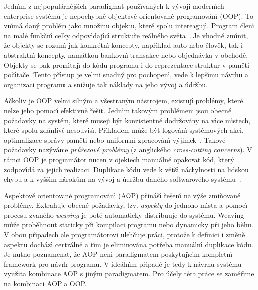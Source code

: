Jedn\'{\i}m z nejpopulárnějš\'{\i}ch paradigmat použ\'{\i}van\'ych k
v\'yvoji modern\'{\i}ch enterprise systémů je nepochybně
objektově orientované programován\'{\i} (\gls{OOP}). To vn\'{\i}má dan\'y problém
jako množinu objektu, které spolu intereaguj\'{\i}. Program
člen\'{\i} na malé funkčn\'{\i} celky odpov\'{\i}daj\'{\i}c\'{\i} struktuře
reálného světa~\cite{rentsch1982object}. Je vhodné zm\'{\i}nit,
že objekty se rozum\'{\i} jak konkrétn\'{\i} koncepty, např\'{\i}klad
auto nebo člověk, tak i abstraktn\'{\i} koncepty,
namátkou bankovn\'{\i} transakce nebo objednávka v obchodě.
Objekty se pak prom\'{\i}taj\'{\i} do kódu programu i do
reprezentace struktur v paměti poč\'{\i}tače.
Tento př\'{\i}stup je velmi snadn\'y pro pochopen\'{\i},
vede k lepš\'{\i}mu návrhu a organizaci programu a snižuje
tak náklady na jeho v\'yvoj a údržbu.

Ačkoliv je \gls{OOP} velmi siln\'ym a všestran\'ym nástrojem,
existuj\'{\i} problémy, které nelze jeho pomoc\'{\i} efektivně řešit.
Jedn\'{\i}m takov\'ym problémem jsou obecné požadavky na systém,
které musej\'{\i} b\'yt konzistentně dodržovány na v\'{\i}ce m\'{\i}stech,
které spolu zdánlivě nesouvis\'{\i}. Př\'{\i}kladem
může b\'yt logován\'{\i} systémov\'ych akc\'{\i}, optimalizace správy paměti
nebo uniformn\'{\i} zpracován\'{\i} v\'yjimek~\cite{kiczales1997aspect}.
Takové požadavky naz\'yváme \textit{průřezové problémy}
(z anglického \textit{cross-cutting concerns}).
V rámci \gls{OOP} je programátor nucen v ojektech manuálně opakovat
kód, kter\'y zodpov\'{\i}dá za jejich realizaci. Duplikace kódu
vede k větš\'{\i} náchylnosti na lidskou chybu a k vyšš\'{\i}m nárokům na v\'yvoj
a údržbu daného softwarového systému~\cite{fowler1999refactoring}.

Aspektově orientované programován\'{\i} (\gls{AOP}) přináš\'{\i} řešen\'{\i} na
v\'yše zmiňované problémy. Extrahuje obecné požadavky,
tzv. \textit{aspekty} do jednoho m\'{\i}sta a pomoc\'{\i} procesu zvaného
\textit{weaving} je poté automaticky distribuuje do systému.
Weaving může proběhnout staticky při kompilaci programu nebo dynamicky
při jeho běhu. V obou př\'{\i}padech ale programátorovi ulehčuje práci,
protože k definici i změně aspektu docház\'{\i} centrálně a t\'{\i}m je eliminována
potřeba manuáln\'{\i} duplikace kódu. Je nutno poznamenat, že \gls{AOP} nen\'{\i}
paradigmatem poskytuj\'{\i}c\'{\i}m kompletn\'{\i} framework pro návrh programu.
V ideáln\'{\i}m př\'{\i}padě je tedy k návrhu systému využita kombinace
\gls{AOP} s jin\'ym paradigmatem. Pro účely této práce se zaměř\'{\i}me na
kombinaci \gls{AOP} a \gls{OOP}.

